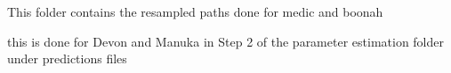 This folder contains the resampled paths done for medic and boonah

this is done for Devon and Manuka in Step 2 of the parameter estimation folder under predictions files

